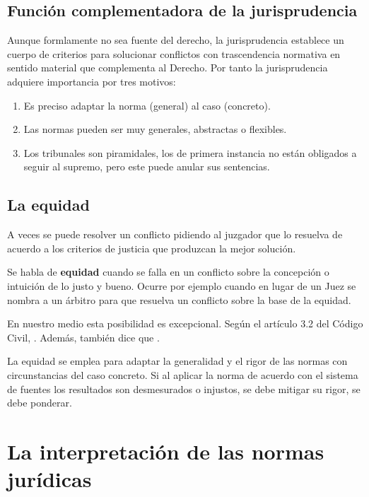 \documentclass[a4paper,12pt]{report}
\begin{document}
\subsection{Función complementadora de la jurisprudencia}
Aunque formlamente no sea fuente del derecho, la jurisprudencia establece un cuerpo de criterios para solucionar conflictos con trascendencia normativa en sentido material que complementa al Derecho. Por tanto la jurisprudencia adquiere importancia por tres motivos:

\begin{enumerate}
\item Es preciso adaptar la norma (general) al caso (concreto).
\item Las normas pueden ser muy generales, abstractas o flexibles.
\item Los tribunales son piramidales, los de primera instancia no están obligados a seguir al supremo, pero este puede anular sus sentencias.
\end{enumerate}

\subsection{La equidad}
A veces se puede resolver un conflicto pidiendo al juzgador que lo resuelva de acuerdo a los criterios de justicia que produzcan la mejor solución.

Se habla de \textbf{equidad} cuando se falla en un conflicto sobre la concepción o intuición de lo justo y bueno. Ocurre por ejemplo cuando en lugar de un Juez se nombra a un árbitro para que resuelva un conflicto sobre la base de la equidad.

En nuestro medio esta posibilidad es excepcional. Según el artículo 3.2 del Código Civil, . Además, también dice que .

La equidad se emplea para adaptar la generalidad y el rigor de las normas con circunstancias del caso concreto. Si al aplicar la norma de acuerdo con el sistema de fuentes los resultados son desmesurados o injustos, se debe mitigar su rigor, se debe ponderar.

\section{La interpretación de las normas jurídicas}
\end{document}
